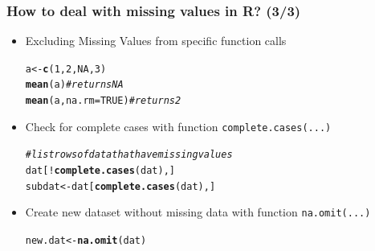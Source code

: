 \documentclass{beamer}\usepackage[]{graphicx}\usepackage[]{color}
\makeatletter
\newcommand{\hlnum}[1]{\textcolor[rgb]{0.686,0.059,0.569}{#1}}%
\newcommand{\hlcom}[1]{\textcolor[rgb]{0.678,0.584,0.686}{\textit{#1}}}%
\newcommand{\hlopt}[1]{\textcolor[rgb]{0,0,0}{#1}}%
\newcommand{\hlstd}[1]{\textcolor[rgb]{0.345,0.345,0.345}{#1}}%
\newcommand{\hlkwb}[1]{\textcolor[rgb]{0.69,0.353,0.396}{#1}}%
\newcommand{\hlkwc}[1]{\textcolor[rgb]{0.333,0.667,0.333}{#1}}%
\newcommand{\hlkwd}[1]{\textcolor[rgb]{0.737,0.353,0.396}{\textbf{#1}}}%
\newenvironment{kframe}{%
 \def\at@end@of@kframe{}%
 \ifinner\ifhmode%
  \def\at@end@of@kframe{\end{minipage}}%
  \begin{minipage}{\columnwidth}%
 \fi\fi%
 \def\FrameCommand##1{\hskip\@totalleftmargin \hskip-\fboxsep
 \colorbox{shadecolor}{##1}\hskip-\fboxsep
     \hskip-\linewidth \hskip-\@totalleftmargin \hskip\columnwidth}%
 \MakeFramed {\advance\hsize-\width
   \@totalleftmargin\z@ \linewidth\hsize
   \@setminipage}}%
 {\par\unskip\endMakeFramed%
 \at@end@of@kframe}
\newenvironment{knitrout}{}{} %
\makeatother
\begin{document}
{{{%

\begin{frame}[fragile]
\frametitle{How to deal with missing values in R? (3/3)}
\begin{itemize}
\setlength\itemsep{1.3em}
\item Excluding Missing Values from specific function calls
\begin{knitrout}\scriptsize
{}\color{fgcolor}\begin{kframe}
\begin{alltt}
\hlstd{a} \hlkwb{<-} \hlkwd{c}\hlstd{(}\hlnum{1}\hlstd{,} \hlnum{2}\hlstd{,} \hlnum{NA}\hlstd{,} \hlnum{3}\hlstd{)}
\hlkwd{mean}\hlstd{(a)} \hlcom{# returns NA}
\hlkwd{mean}\hlstd{(a,} \hlkwc{na.rm}\hlstd{=}\hlnum{TRUE}\hlstd{)} \hlcom{# returns 2}
\end{alltt}
\end{kframe}
\end{knitrout}
\item Check for complete cases with function \texttt{complete.cases(...)}
\begin{knitrout}\scriptsize
{}\color{fgcolor}\begin{kframe}
\begin{alltt}
\hlcom{# list rows of data that have missing values}
\hlstd{dat[}\hlopt{!}\hlkwd{complete.cases}\hlstd{(dat),]}
\hlstd{subdat} \hlkwb{<-} \hlstd{dat[}\hlkwd{complete.cases}\hlstd{(dat),]}
\end{alltt}
\end{kframe}
\end{knitrout}
\item Create new dataset without missing data with function \texttt{na.omit(...)}
\begin{knitrout}\scriptsize
{}\color{fgcolor}\begin{kframe}
\begin{alltt}
\hlstd{new.dat} \hlkwb{<-} \hlkwd{na.omit}\hlstd{(dat)}
\end{alltt}
\end{kframe}
\end{knitrout}
\end{itemize}
\end{frame}


}}}
\end{document}
